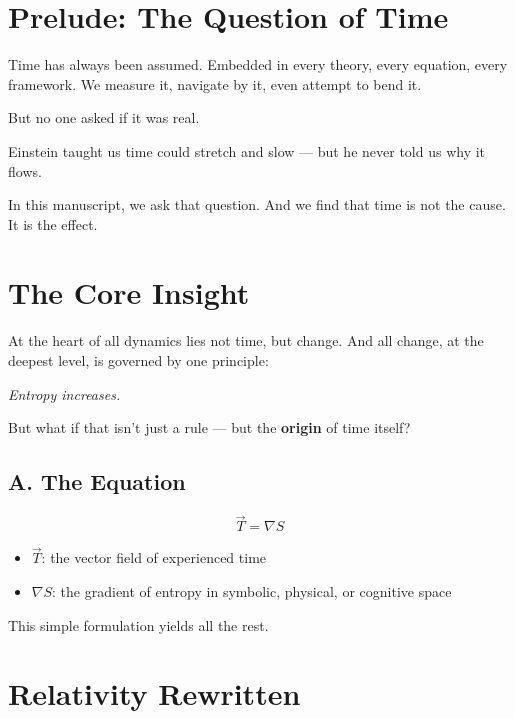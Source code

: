 \documentclass[12pt]{article}
\begin{document}

\section*{Prelude: The Question of Time}

Time has always been assumed. Embedded in every theory, every equation, every framework. We measure it, navigate by it, even attempt to bend it.

But no one asked if it was real.

Einstein taught us time could stretch and slow — but he never told us why it flows.

In this manuscript, we ask that question. And we find that time is not the cause. It is the effect.

\section*{The Core Insight}

At the heart of all dynamics lies not time, but change. And all change, at the deepest level, is governed by one principle:

\textit{Entropy increases.}

But what if that isn't just a rule — but the \textbf{origin} of time itself?

\subsection*{A. The Equation}

\[
\vec{T} = \nabla S
\]

\begin{itemize}
\item $\vec{T}$: the vector field of experienced time
\item $\nabla S$: the gradient of entropy in symbolic, physical, or cognitive space
\end{itemize}

This simple formulation yields all the rest.

\section*{Relativity Rewritten}
\end{document}
